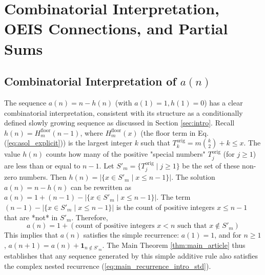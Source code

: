 \documentclass[11pt,a4paper]{article} %
\theoremstyle{remark}
\newcommand{\indicator}[1]{\mathbf{1}_{#1}} %
\begin{document}
\section{Combinatorial Interpretation, OEIS Connections, and Partial Sums} \label{sec:comb_interp}

\subsection{Combinatorial Interpretation of $a(n)$}
The sequence $a(n)=n-h(n)$ (with $a(1)=1, h(1)=0$) has a clear combinatorial interpretation, consistent with its structure as a conditionally defined slowly growing sequence as discussed in Section \ref{sec:intro}.
Recall $h(n)=H_m^{\text{floor}}(n-1)$, where $H_m^{\text{floor}}(x)$ (the floor term in Eq. (\ref{eq:asol_explicit})) is the largest integer $k$ such that $T_k^{\text{orig}} = m\binom{k}{2}+k \le x$.
The value $h(n)$ counts how many of the positive "special numbers" $T_j^{\text{orig}}$ (for $j \ge 1$) are less than or equal to $n-1$. Let $S'_m = \{T_j^{\text{orig}} \mid j \ge 1\}$ be the set of these non-zero numbers.
Then $h(n) = |\{x \in S'_m \mid x \le n-1\}|$.
The solution $a(n) = n - h(n)$ can be rewritten as $a(n) = 1 + (n-1) - |\{x \in S'_m \mid x \le n-1\}|$.
The term $(n-1) - |\{x \in S'_m \mid x \le n-1\}|$ is the count of positive integers $x \le n-1$ that are *not* in $S'_m$.
Therefore,
$$a(n) = 1 + (\text{count of positive integers } x < n \text{ such that } x \notin S'_m)$$
This implies that $a(n)$ satisfies the simple recurrence: $a(1)=1$, and for $n \ge 1$, $a(n+1) = a(n) + \indicator{n \notin S'_m}$. The Main Theorem \ref{thm:main_article} thus establishes that any sequence generated by this simple additive rule also satisfies the complex nested recurrence (\ref{eq:main_recurrence_intro_std}).
\end{document}
